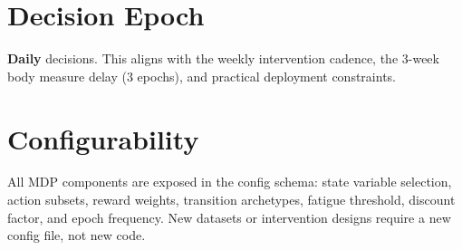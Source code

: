 \documentclass[11pt,a4paper]{article}
\begin{document}
\section{Decision Epoch}

\textbf{Daily} decisions. This aligns with the weekly intervention cadence,
the 3-week body measure delay (3 epochs), and practical deployment constraints.

\section{Configurability}

All MDP components are exposed in the config schema: state variable selection,
action subsets, reward weights, transition archetypes, fatigue threshold,
discount factor, and epoch frequency. New datasets or intervention designs
require a new config file, not new code.
\end{document}
